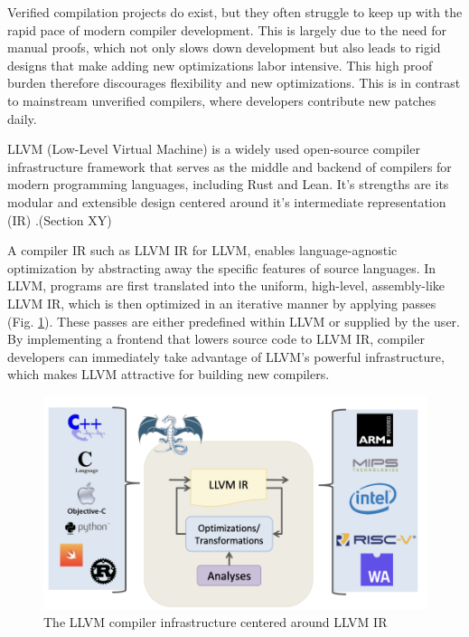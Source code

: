 Verified compilation projects do exist, but they often struggle to keep up with the rapid pace of modern compiler development. This is largely due to the need for manual proofs, which not only slows down development but also leads to rigid designs that make adding new optimizations labor intensive. This high proof burden therefore discourages flexibility and new optimizations. This is in contrast to mainstream unverified compilers, where developers contribute new patches daily.


 LLVM (Low-Level Virtual Machine) is a widely used open-source compiler infrastructure framework that serves as the middle and backend of compilers for modern programming languages, including Rust and Lean. It's strengths are its modular and extensible design centered around it's intermediate representation (IR) \cite{llvm_ref}.(Section XY)

A compiler IR such as LLVM IR for LLVM, enables language-agnostic optimization by abstracting away the specific features of source languages. In LLVM, programs are first translated into the uniform, high-level, assembly-like LLVM IR, which is then optimized in an iterative manner by applying passes (Fig. \ref{fig:intro_llvm}). These passes are either predefined within LLVM or supplied by the user. By implementing a frontend that lowers source code to LLVM IR, compiler developers can immediately take advantage of LLVM's powerful infrastructure, which makes LLVM attractive for building new compilers.
\cite{}
\begin{figure}[htbp]
  \centering
  \includegraphics[scale=0.4]{thesis/llvm.png}
  \caption{The LLVM compiler infrastructure centered around LLVM IR}
  \label{fig:intro_llvm}
\end{figure}

